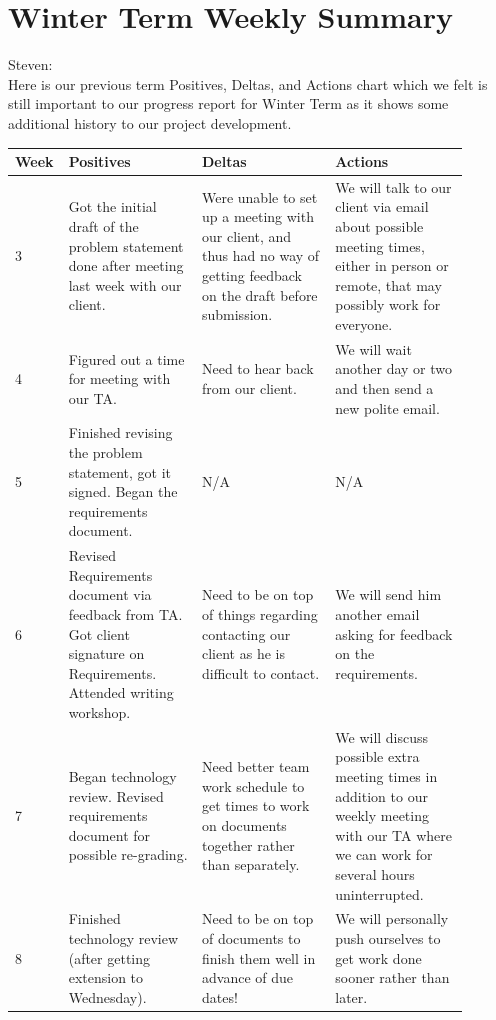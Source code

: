 \documentclass[onecolumn, draftclsnofoot,10pt, compsoc]{IEEEtran}
\begin{document}
\newpage
\section{Winter Term Weekly Summary}
\noindent Steven:\\
\noindent Here is our previous term Positives, Deltas, and Actions chart which we felt is
still important to our progress report for Winter Term as it shows some additional history
to our project development. \\

\begin{flushleft}
\begin{tabular}{|p{0.05\linewidth}|p{0.285\linewidth}|p{0.285\linewidth}|p{0.285\linewidth}|}
\hline
	Week & Positives & Deltas & Actions \\ \hline

	3
	& Got the initial draft of the problem statement done after meeting last
	week with our client.
	& Were unable to set up a meeting with our client, and thus had no way of
	getting feedback on the draft before submission.
	& We will talk to our client via email about possible meeting times, either
	in person or remote, that may possibly work for everyone. \\ \hline

	4
	& Figured out a time for meeting with our TA.
	& Need to hear back from our client.
	& We will wait another day or two and then send a new polite email. \\ \hline

	5
	& Finished revising the problem statement, got it signed.
		Began the requirements document.
	& N/A
	& N/A\\ \hline

	6
	& Revised Requirements document via feedback from TA. Got client signature on Requirements.
		Attended writing workshop.
	& Need to be on top of things regarding contacting our client as
		he is difficult to contact.
	& We will send him another email asking for feedback on the requirements. \\ \hline

	7
	& Began technology review. Revised requirements document for possible re-grading.
	& Need better team work schedule to get times to work on documents
	together rather than separately.
	& We will discuss possible extra meeting times in addition to our weekly meeting
	with our TA where we can work for several hours uninterrupted. \\ \hline

	8
	& Finished technology review (after getting extension to Wednesday).
	& Need to be on top of documents to finish them well in advance of due dates!
	& We will personally push ourselves to get work done sooner rather than later. \\ \hline



\end{tabular}
\end{flushleft}
\end{document}
